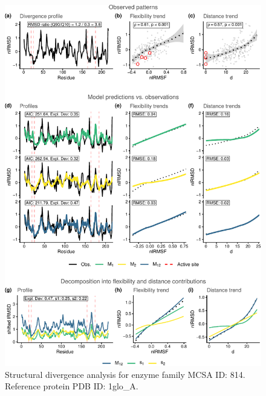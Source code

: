 \documentclass[
]{article}
\begin{document}
\clearpage
\begin{figure}[H]
\centering


\begin{center}\includegraphics{supplementary_material_files/figure-latex/generate_figures-29} \end{center}

\caption{Structural divergence analysis for enzyme family MCSA ID: 814. Reference protein PDB ID: 1glo\_A.}
\end{figure}
\end{document}
